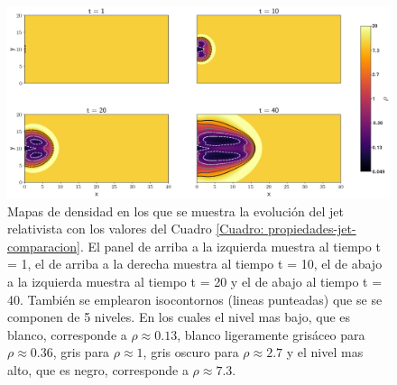 \documentclass[12pt,a4paper]{book}
\begin{document}
\begin{figure}
  \centering
  \includegraphics[width=1\textwidth]{./Figuras/jet/evolucion/evolucion.png}
    \caption{Mapas de densidad en los que se muestra la evolución del jet relativista 
    con los valores del Cuadro 
    \ref{Cuadro: propiedades-jet-comparacion}. El panel de arriba a la izquierda muestra al 
    tiempo t = 1, el de arriba a la derecha muestra al tiempo t = 10, 
    el de abajo a la izquierda muestra al tiempo t = 20 y el de abajo al tiempo t = 40.
    También se emplearon isocontornos (lineas punteadas) que se se componen de 5 niveles. En los 
    cuales el nivel mas bajo, que es blanco, corresponde a $\rho \approx 0.13$, blanco ligeramente grisáceo 
    para $\rho \approx 0.36$,
    gris para $\rho \approx 1$, gris oscuro para $\rho  \approx 2.7$ y el nivel mas alto, que es negro, 
    corresponde a $\rho \approx 7.3$.}
    \label{fig:evolucion_temporal_del_jet}
\end{figure}
\end{document}
